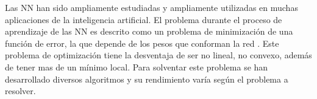 



Las NN han sido ampliamente estudiadas y ampliamente utilizadas en muchas aplicaciones de la inteligencia artificial. El problema durante el proceso de aprendizaje de las NN es descrito como un problema de minimización de una función de error, la que depende de los pesos que conforman la red \cite{Rumelhart1986}. Este problema de optimización tiene la desventaja de ser no lineal, no convexo, además de tener mas de un mínimo local. Para solventar este problema se han desarrollado diversos algoritmos \cite{Grippo1994,Jacobs1988,Plagianakos2002,Rumelhart1986b,Plagianakos1998}  y su rendimiento varía según el problema a resolver.

